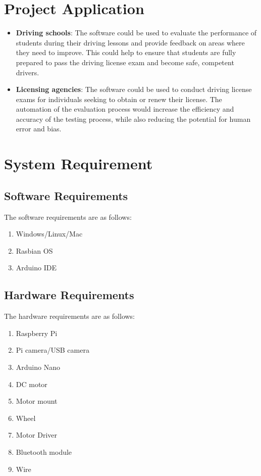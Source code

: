 \section{Project Application}
\vspace{-18pt}
\begin{itemize}
\item \textbf{Driving schools}: The software could be used to evaluate the performance of students during their driving lessons and provide feedback on areas where they need to improve. This could help to ensure that students are fully prepared to pass the driving license exam and become safe, competent drivers.
\item \textbf{Licensing agencies}: The software could be used to conduct driving license exams for individuals seeking to obtain or renew their license. The automation of the evaluation process would increase the efficiency and accuracy of the testing process, while also reducing the potential for human error and bias.
\end{itemize}

\section{System Requirement}
\vspace{-18pt}
\subsection{Software Requirements}
The software requirements are as follows:
\begin{enumerate}
\item Windows/Linux/Mac
\item Rasbian OS
\item Arduino IDE
\end{enumerate}

\subsection{Hardware Requirements}
The hardware requirements are as follows:
\begin{enumerate}
\item Raspberry Pi
\item Pi camera/USB camera
\item Arduino Nano
\item DC motor
\item Motor mount
\item Wheel
\item Motor Driver
\item Bluetooth module
\item Wire
\end{enumerate}
\label{tblSampleTable}


